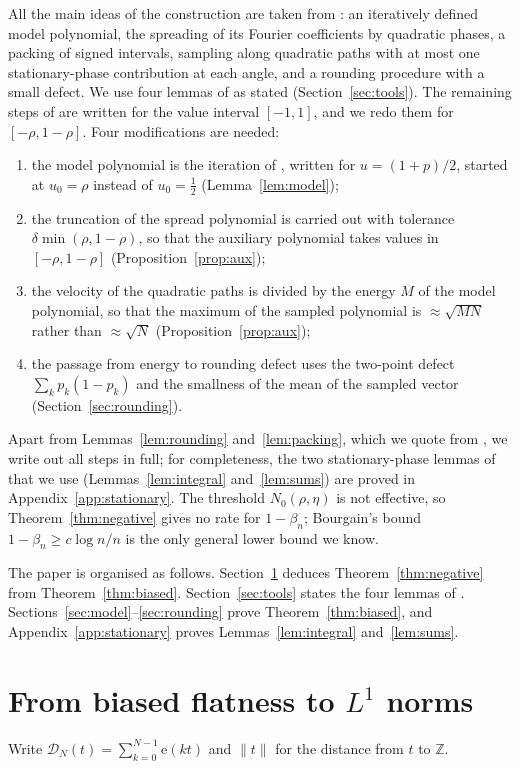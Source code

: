 \documentclass[11pt,reqno]{amsart}
\theoremstyle{definition}
\newcommand{\Z}{\mathbb{Z}}
\newcommand{\e}{\mathrm{e}}
\newcommand{\cD}{\mathcal{D}}
\begin{document}
All the main ideas of the construction are taken from \cite{AMM}: an iteratively defined model polynomial, the spreading of its Fourier coefficients by quadratic phases, a packing of signed intervals, sampling along quadratic paths with at most one stationary-phase contribution at each angle, and a rounding procedure with a small defect. We use four lemmas of \cite{AMM} as stated (Section~\ref{sec:tools}). The remaining steps of \cite{AMM} are written for the value interval $[-1,1]$, and we redo them for $[-\rho,1-\rho]$. Four modifications are needed:
\begin{enumerate}
\item[(M1)] the model polynomial is the iteration of \cite{AMM}, written for $u=(1+p)/2$, started at $u_0=\rho$ instead of $u_0=\frac12$ (Lemma~\ref{lem:model});
\item[(M2)] the truncation of the spread polynomial is carried out with tolerance $\delta\min(\rho,1-\rho)$, so that the auxiliary polynomial takes values in $[-\rho,1-\rho]$ (Proposition~\ref{prop:aux});
\item[(M3)] the velocity of the quadratic paths is divided by the energy $M$ of the model polynomial, so that the maximum of the sampled polynomial is $\approx\sqrt{MN}$ rather than $\approx\sqrt N$ (Proposition~\ref{prop:aux});
\item[(M4)] the passage from energy to rounding defect uses the two-point defect $\sum_kp_k(1-p_k)$ and the smallness of the mean of the sampled vector (Section~\ref{sec:rounding}).
\end{enumerate}
Apart from Lemmas~\ref{lem:rounding} and~\ref{lem:packing}, which we quote from \cite{AMM}, we write out all steps in full; for completeness, the two stationary-phase lemmas of \cite{AMM} that we use (Lemmas~\ref{lem:integral} and~\ref{lem:sums}) are proved in Appendix~\ref{app:stationary}. The threshold $N_0(\rho,\eta)$ is not effective, so Theorem~\ref{thm:negative} gives no rate for $1-\beta_n$; Bourgain's bound $1-\beta_n\ge c\log n/n$ is the only general lower bound we know.

The paper is organised as follows. Section~\ref{sec:deduction} deduces Theorem~\ref{thm:negative} from Theorem~\ref{thm:biased}. Section~\ref{sec:tools} states the four lemmas of \cite{AMM}. Sections~\ref{sec:model}--\ref{sec:rounding} prove Theorem~\ref{thm:biased}, and Appendix~\ref{app:stationary} proves Lemmas~\ref{lem:integral} and~\ref{lem:sums}.

\section{From biased flatness to \texorpdfstring{$L^1$}{L1} norms}\label{sec:deduction}
Write $\cD_N(t)=\sum_{k=0}^{N-1}\e(kt)$ and $\|t\|$ for the distance from $t$ to $\Z$.
\end{document}
